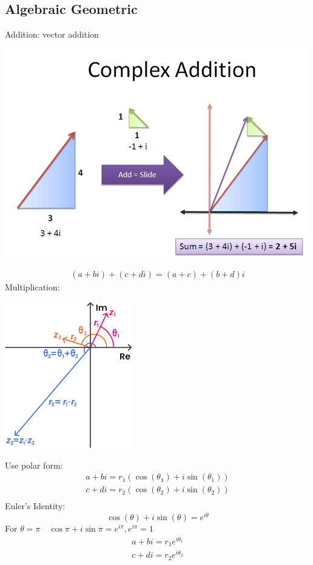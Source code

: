     \subsection{Algebraic Geometric}
    Addition: vector addition 
    \begin{center}
        \includegraphics[totalheight=4cm]{Images/lec18_vec_add.png}
    \end{center}
    \begin{align*}
        (a+bi)+(c+di)=(a+c)+(b+d)i
    \end{align*}
    Multiplication: 
    \begin{center}
        \includegraphics[totalheight=4cm]{Images/lec18_vec_mul.png}
    \end{center}

    Use polar form:
    \begin{align*}
        a+bi=r_1(\cos(\theta_1)+i\sin(\theta_1)) \\
        c+di=r_2(\cos(\theta_2)+i\sin(\theta_2)) \\
    \end{align*}
    Euler's Identity:
    \[ 
        \cos(\theta) + i\sin(\theta) = e^{i\theta}
    \]
    For $\theta=\pi \quad \cos\pi + i\sin\pi = e^{i\pi}, e^{i\pi} = 1$
    \begin{align*}
        a+bi=r_1e^{i\theta_1} \\
        c+di = r_2 e^{i\theta_2}
    \end{align*}

